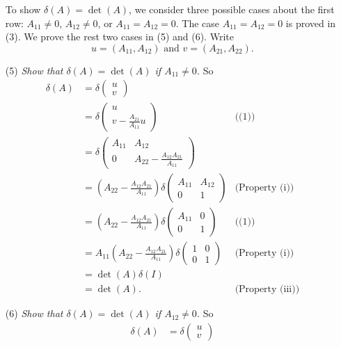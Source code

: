 \documentclass{article}
\begin{document}
\begin{enumerate}
To show $\delta(A) = \det(A)$,
we consider three possible cases about the first row:
$A_{11} \neq 0$, $A_{12} \neq 0$, or $A_{11} = A_{12} = 0$.
The case $A_{11} = A_{12} = 0$ is proved in (3).
We prove the rest two cases in (5) and (6).
Write
$$u = (A_{11}, A_{12}) \text{ and } v = (A_{21}, A_{22}).$$
\item[(5)]
\emph{Show that $\delta(A) = \det(A)$ if $A_{11} \neq 0$.}
So
\begin{align*}
\delta(A)
&= \delta\begin{pmatrix} u \\ v \end{pmatrix} \\
&= \delta\begin{pmatrix} u \\ v - \frac{A_{21}}{A_{11}} u \end{pmatrix}
  &\text{((1))} \\
&= \delta\begin{pmatrix}
    A_{11} & A_{12} \\
    0 & A_{22}-\frac{A_{12}A_{21}}{A_{11}}
  \end{pmatrix} \\
&= \left( A_{22}-\frac{A_{12}A_{21}}{A_{11}} \right)
  \delta\begin{pmatrix}
    A_{11} & A_{12} \\
    0 & 1
  \end{pmatrix}
  &\text{(Property (i))} \\
&= \left( A_{22}-\frac{A_{12}A_{21}}{A_{11}} \right)
  \delta\begin{pmatrix}
    A_{11} & 0 \\
    0 & 1
  \end{pmatrix}
  &\text{((1))} \\
&= A_{11}\left( A_{22}-\frac{A_{12}A_{21}}{A_{11}} \right)
  \delta\begin{pmatrix}
    1 & 0 \\
    0 & 1
  \end{pmatrix}
  &\text{(Property (i))} \\
&= \det(A)\delta(I) \\
&= \det(A).
  &\text{(Property (iii))}
\end{align*}
\item[(6)]
\emph{Show that $\delta(A) = \det(A)$ if $A_{12} \neq 0$.}
So
\begin{align*}
\delta(A)
&= \delta\begin{pmatrix} u \\ v \end{pmatrix} \\

\end{align*}
\end{enumerate}
\end{document}
